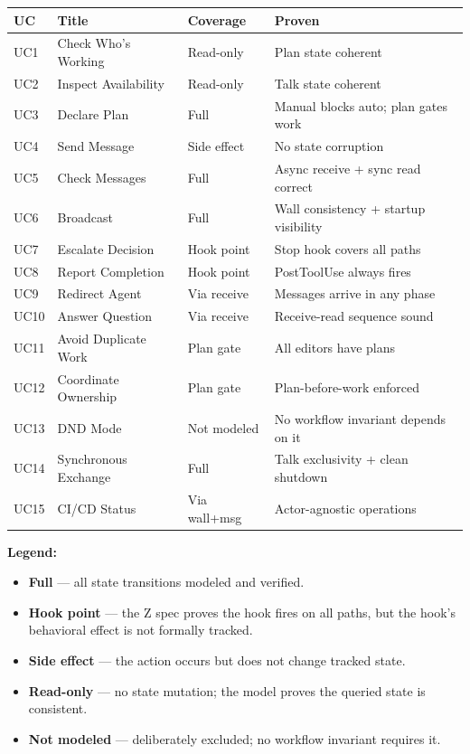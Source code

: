 \documentclass[a4paper,10pt,fleqn]{article}
\begin{document}
\begin{tabular}{llll}
\hline
\textbf{UC} & \textbf{Title} & \textbf{Coverage} & \textbf{Proven} \\
\hline
UC1 & Check Who's Working & Read-only & Plan state coherent \\
UC2 & Inspect Availability & Read-only & Talk state coherent \\
UC3 & Declare Plan & Full & Manual blocks auto; plan gates work \\
UC4 & Send Message & Side effect & No state corruption \\
UC5 & Check Messages & Full & Async receive + sync read correct \\
UC6 & Broadcast & Full & Wall consistency + startup visibility \\
UC7 & Escalate Decision & Hook point & Stop hook covers all paths \\
UC8 & Report Completion & Hook point & PostToolUse always fires \\
UC9 & Redirect Agent & Via receive & Messages arrive in any phase \\
UC10 & Answer Question & Via receive & Receive-read sequence sound \\
UC11 & Avoid Duplicate Work & Plan gate & All editors have plans \\
UC12 & Coordinate Ownership & Plan gate & Plan-before-work enforced \\
UC13 & DND Mode & Not modeled & No workflow invariant depends on it \\
UC14 & Synchronous Exchange & Full & Talk exclusivity + clean shutdown \\
UC15 & CI/CD Status & Via wall+msg & Actor-agnostic operations \\
\hline
\end{tabular}

\textbf{Legend:}
\begin{itemize}
  \item \textbf{Full} --- all state transitions modeled and verified.
  \item \textbf{Hook point} --- the Z spec proves the hook fires on all
    paths, but the hook's behavioral effect is not formally tracked.
  \item \textbf{Side effect} --- the action occurs but does not change
    tracked state.
  \item \textbf{Read-only} --- no state mutation; the model proves the
    queried state is consistent.
  \item \textbf{Not modeled} --- deliberately excluded; no workflow
    invariant requires it.
\end{itemize}
\end{document}
